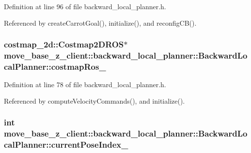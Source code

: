 Definition at line 96 of file backward\+\_\+local\+\_\+planner.\+h.



Referenced by create\+Carrot\+Goal(), initialize(), and reconfig\+C\+B().

\subsubsection[{\texorpdfstring{costmap\+Ros\+\_\+}{costmapRos_}}]{\setlength{\rightskip}{0pt plus 5cm}costmap\+\_\+2d\+::\+Costmap2\+D\+R\+OS$\ast$ move\+\_\+base\+\_\+z\+\_\+client\+::backward\+\_\+local\+\_\+planner\+::\+Backward\+Local\+Planner\+::costmap\+Ros\+\_\+\hspace{0.3cm}{\ttfamily [private]}}\hypertarget{classmove__base__z__client_1_1backward__local__planner_1_1BackwardLocalPlanner_a865618f84238fe6ff437d1e38ec5fec0}{}\label{classmove__base__z__client_1_1backward__local__planner_1_1BackwardLocalPlanner_a865618f84238fe6ff437d1e38ec5fec0}


Definition at line 78 of file backward\+\_\+local\+\_\+planner.\+h.



Referenced by compute\+Velocity\+Commands(), and initialize().

\subsubsection[{\texorpdfstring{current\+Pose\+Index\+\_\+}{currentPoseIndex_}}]{\setlength{\rightskip}{0pt plus 5cm}int move\+\_\+base\+\_\+z\+\_\+client\+::backward\+\_\+local\+\_\+planner\+::\+Backward\+Local\+Planner\+::current\+Pose\+Index\+\_\+\hspace{0.3cm}{\ttfamily [private]}}\hypertarget{classmove__base__z__client_1_1backward__local__planner_1_1BackwardLocalPlanner_af304b2e7cde744ad905a1ae7889102b6}{}\label{classmove__base__z__client_1_1backward__local__planner_1_1BackwardLocalPlanner_af304b2e7cde744ad905a1ae7889102b6}


